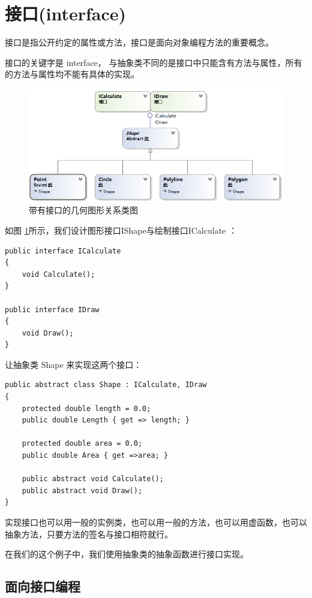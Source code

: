 \section{接口(interface)}
接口是指公开约定的属性或方法，接口是面向对象编程方法的重要概念。

接口的关键字是 interface， 与抽象类不同的是接口中只能含有方法与属性，所有的方法与属性均不能有具体的实现。

\begin{figure}[htbp]
	\centering
	\includegraphics[scale=0.6]{chapter/csobject/igraph.png}
	\caption{带有接口的几何图形关系类图}
	\label{fig:igraph}
\end{figure}

如图 \ref{fig:igraph}所示，我们设计图形接口IShape与绘制接口ICalculate ：

\begin{lstlisting}
public interface ICalculate
{
	void Calculate();
}

public interface IDraw
{
	void Draw();
}
\end{lstlisting}

让抽象类 Shape 来实现这两个接口：

\begin{lstlisting}
public abstract class Shape : ICalculate, IDraw
{
	protected double length = 0.0;
	public double Length { get => length; }
	
	protected double area = 0.0;
	public double Area { get =>area; }
	
	public abstract void Calculate();
	public abstract void Draw();
}
\end{lstlisting}

实现接口也可以用一般的实例类，也可以用一般的方法，也可以用虚函数，也可以抽象方法，只要方法的签名与接口相符就行。

在我们的这个例子中，我们使用抽象类的抽象函数进行接口实现。

\subsection{面向接口编程}

